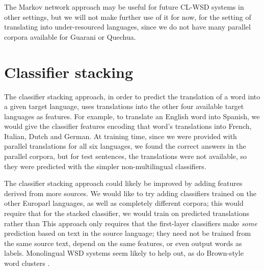 The Markov network approach may be useful for future CL-WSD systems in other
settings, but we will not make further use of it for now, for the setting of
translating into under-resourced languages, since we do not have many parallel
corpora available for Guarani or Quechua.

\section{Classifier stacking}
The classifier stacking approach, in order to predict the translation of a word
into a given target language, uses translations into the other four available
target languages as features.
For example, to translate an English word into Spanish, we would give the
classifier features encoding that word's translations into French, Italian,
Dutch and German.
At training time, since we were provided with parallel translations for all six
languages, we found the correct answers in the parallel corpora, but for test
sentences, the translations were not available, so they were predicted with the
simpler non-multilingual classifiers.

The classifier stacking approach could likely be improved by adding features
derived from more sources.
We would like to try adding classifiers trained on the other Europarl
languages, as well as completely different corpora; this would require that for
the stacked classifier, we would train on predicted translations rather than
This approach only requires that the first-layer classifiers make \emph{some}
prediction based on text in the source language;
they need not be trained from the same source text, depend on the same
features, or even output words as labels. Monolingual WSD systems seem likely
to help out, as do Brown-style word clusters \cite{brown1992class}.
